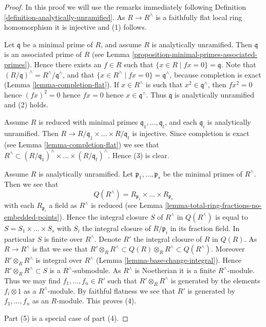 \begin{proof}
In this proof we will use the remarks immediately following
Definition \ref{definition-analytically-unramified}.
As $R \to R^\wedge$ is a faithfully flat local ring homomorphism
it is injective and (1) follows.

\medskip\noindent
Let $\mathfrak q$ be a minimal prime of $R$, and assume $R$ is
analytically unramified.
Then $\mathfrak q$ is an associated
prime of $R$ (see Lemma \ref{proposition-minimal-primes-associated-primes}).
Hence there exists an $f \in R$
such that $\{x \in R \mid fx = 0\} = \mathfrak q$.
Note that $(R/\mathfrak q)^\wedge = R^\wedge/\mathfrak q^\wedge$,
and that $\{x \in R^\wedge \mid fx = 0\} = \mathfrak q^\wedge$,
because completion is exact (Lemma \ref{lemma-completion-flat}).
If $x \in R^\wedge$ is such
that $x^2 \in \mathfrak q^\wedge$, then $fx^2 = 0$ hence
$(fx)^2 = 0$ hence $fx = 0$ hence $x \in \mathfrak q^\wedge$.
Thus $\mathfrak q$ is analytically unramified and (2) holds.

\medskip\noindent
Assume $R$ is reduced with minimal primes
$\mathfrak q_1, \ldots, \mathfrak q_t$, and each $\mathfrak q_i$
is analytically unramified. Then
$R \to R/\mathfrak q_1 \times \ldots \times R/\mathfrak q_t$ is
injective. Since completion is exact (see Lemma \ref{lemma-completion-flat})
we see that
$R^\wedge \subset (R/\mathfrak q_1)^\wedge \times \ldots \times
(R/\mathfrak q_t)^\wedge$. Hence (3) is clear.

\medskip\noindent
Assume $R$ is analytically unramified.
Let $\mathfrak p_1, \ldots, \mathfrak p_s$ be the minimal primes
of $R^\wedge$. Then we see that
$$
Q(R^\wedge) = R_{\mathfrak p_1} \times \ldots \times R_{\mathfrak p_s}
$$
with each $R_{\mathfrak p_i}$ a field
as $R^\wedge$ is reduced (see
Lemma \ref{lemma-total-ring-fractions-no-embedded-points}).
Hence the integral closure $S$ of $R^\wedge$
in $Q(R^\wedge)$ is equal to $S = S_1 \times \ldots \times S_s$ with
$S_i$ the integral closure of $R/\mathfrak p_i$ in its fraction
field. In particular $S$ is finite over $R^\wedge$.
Denote $R'$ the integral closure of $R$ in $Q(R)$.
As $R \to R^\wedge$ is flat we see that
$R' \otimes_R R^\wedge \subset Q(R) \otimes_R R^\wedge \subset Q(R^\wedge)$.
Moreover $R' \otimes_R R^\wedge$ is integral over $R^\wedge$
(Lemma \ref{lemma-base-change-integral}).
Hence $R' \otimes_R R^\wedge \subset S$ is a $R^\wedge$-submodule.
As $R^\wedge$ is Noetherian it is a finite $R^\wedge$-module.
Thus we may find $f_1, \ldots, f_n \in R'$ such that
$R' \otimes_R R^\wedge$ is generated by the elements $f_i \otimes 1$
as a $R^\wedge$-module.
By faithful flatness we see that $R'$ is generated by $f_1, \ldots, f_n$
as an $R$-module. This proves (4).

\medskip\noindent
Part (5) is a special case of part (4).
\end{proof}

